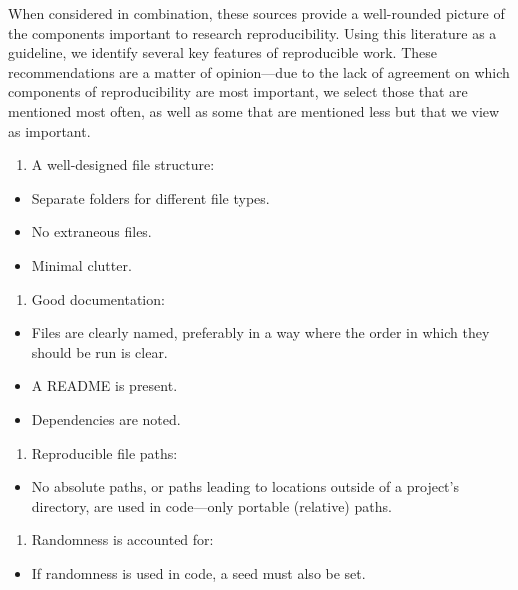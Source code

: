\documentclass[12pt,twoside]{reedthesis}
\providecommand{\tightlist}{%
  \setlength{\itemsep}{0pt}\setlength{\parskip}{0pt}}
\begin{document}
When considered in combination, these sources provide a well-rounded
picture of the components important to research reproducibility. Using
this literature as a guideline, we identify several key features of
reproducible work. These recommendations are a matter of opinion---due
to the lack of agreement on which components of reproducibility are most
important, we select those that are mentioned most often, as well as
some that are mentioned less but that we view as important.
\begin{enumerate}
\def\labelenumi{\arabic{enumi}.}
\tightlist
\item
  A well-designed file structure:
\end{enumerate}
\begin{itemize}
\tightlist
\item
  Separate folders for different file types.
\item
  No extraneous files.
\item
  Minimal clutter.
\end{itemize}
\begin{enumerate}
\def\labelenumi{\arabic{enumi}.}
\setcounter{enumi}{1}
\tightlist
\item
  Good documentation:
\end{enumerate}
\begin{itemize}
\tightlist
\item
  Files are clearly named, preferably in a way where the order in which
  they should be run is clear.
\item
  A README is present.
\item
  Dependencies are noted.
\end{itemize}
\begin{enumerate}
\def\labelenumi{\arabic{enumi}.}
\setcounter{enumi}{2}
\tightlist
\item
  Reproducible file paths:
\end{enumerate}
\begin{itemize}
\tightlist
\item
  No absolute paths, or paths leading to locations outside of a
  project's directory, are used in code---only portable (relative)
  paths.
\end{itemize}
\begin{enumerate}
\def\labelenumi{\arabic{enumi}.}
\setcounter{enumi}{3}
\tightlist
\item
  Randomness is accounted for:
\end{enumerate}
\begin{itemize}
\tightlist
\item
  If randomness is used in code, a seed must also be set.
\end{itemize}
\end{document}
